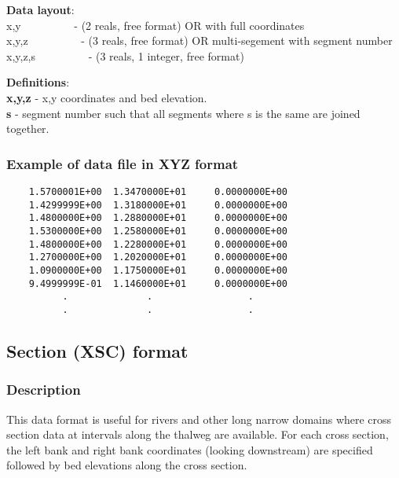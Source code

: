 \documentclass{article}
\begin{document}
\textbf{Data layout}: \\ 

\noindent
x,y \ \ \ \ \ \ \ \ \ {}- (2 reals, free format)\newline
OR with full coordinates \\
x,y,z \ \ \ \ \ \ \ \ \ {}- (3 reals, free format)\newline
OR multi-segement with segment number \\
x,y,z,s \ \ \ \ \ \ \ \ \ {}- (3 reals, 1 integer, free format)\newline

\noindent\textbf{Definitions}:\\ 

\noindent
\textbf{x,y,z} - x,y coordinates and bed elevation. \\
\textbf{s} - segment number such that all segments where s is the same are joined together. \\


\subsubsection{Example of data file in XYZ format}

\begin{small}
\begin{lstlisting}
    1.5700001E+00  1.3470000E+01     0.0000000E+00   
    1.4299999E+00  1.3180000E+01     0.0000000E+00   
    1.4800000E+00  1.2880000E+01     0.0000000E+00   
    1.5300000E+00  1.2580000E+01     0.0000000E+00   
    1.4800000E+00  1.2280000E+01     0.0000000E+00   
    1.2700000E+00  1.2020000E+01     0.0000000E+00   
    1.0900000E+00  1.1750000E+01     0.0000000E+00   
    9.4999999E-01  1.1460000E+01     0.0000000E+00   
          .              .                 .     
          .              .                 .    
\end{lstlisting}
\end{small}

\newpage
\subsection[Section (XSC) format]{Section (XSC) format}

\subsubsection[Description]{Description}

This data format is useful for rivers and other long narrow domains where cross section data at
intervals along the thalweg are available. For each cross section, the left bank and right bank coordinates 
(looking downstream) are specified followed by bed elevations along the cross section. \\
\end{document}
